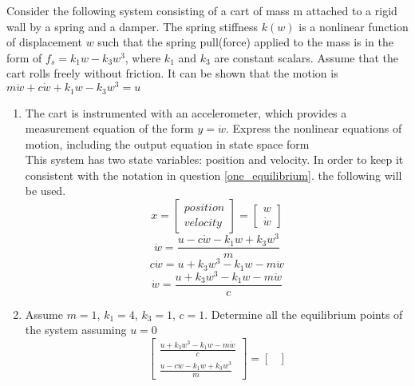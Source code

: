 
\item Consider the following system consisting of a cart of mass m attached to a rigid wall by a spring and a
damper. The spring stiffness $k(w)$ is a nonlinear function of displacement $w$ such that the spring pull(force)
applied to the mass is in the form of $f_s = k_1w - k_3w^3$, where $k_1$ and $k_3$ are constant scalars. Assume
that the cart rolls freely without friction. It can be shown that the motion is
$m\ddot w + c\dot w + k_1w - k_3w^3 = u$
\begin{enumerate}
\item The cart is instrumented with an accelerometer, which provides a measurement equation of the form
  $y = \ddot w$. Express the nonlinear equations of motion, including the output equation in state space form\\
  This system has two state variables: position and velocity. In order to keep it consistent with the notation
  in question \ref{one_equilibrium}. the following will be used.
  \begin{equation}
    x =
    \begin{bmatrix}
      position \\
      velocity
    \end{bmatrix} =
    \begin{bmatrix}
      w \\
      \dot w
    \end{bmatrix}
  \end{equation}
  \begin{equation}
    \ddot w = \frac{u - c\dot w - k_1w + k_3w^3}{m}
  \end{equation}
  \begin{equation}
    c\dot w = u + k_3w^3 - k_1w - m \ddot w
  \end{equation}
  \begin{equation}
    \dot w = \frac{u + k_3w^3 - k_1w - m \ddot w}{c}
  \end{equation}
\item Assume $m = 1$, $k_1 = 4$,
  $k_3 = 1$, $c = 1$. Determine all the
  equilibrium points of the system assuming $u = 0$ \\
  \begin{equation}
    \begin{bmatrix}
      \frac{u + k_3w^3 - k_1w - m \ddot w}{c} \\
      \frac{u - c\dot w - k_1w + k_3w^3}{m}
    \end{bmatrix} =
    \begin{bmatrix}

\end{bmatrix}
\end{equation}
\end{enumerate}
